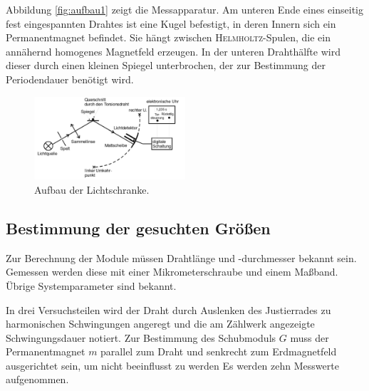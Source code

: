 Abbildung \ref{fig:aufbau1} zeigt die Messapparatur. 
Am unteren Ende eines einseitig fest eingespannten Drahtes ist eine Kugel befestigt, in deren Innern sich ein Permanentmagnet befindet. 
Sie hängt zwischen \textsc{Helmholtz}-Spulen, die ein annähernd homogenes Magnetfeld erzeugen.
In der unteren Drahthälfte wird dieser durch einen kleinen Spiegel unterbrochen, der zur Bestimmung der Periodendauer benötigt wird.
\label{sec:durchfuehrung2}
\begin{figure}[hbp]
	\centering
	\includegraphics[width=0.5\textwidth]{Bilder/Aufbau2.pdf}
	\caption{Aufbau der Lichtschranke. \cite{V102}}
	\label{fig:aufbau2}
\end{figure}
\subsection{Bestimmung der gesuchten Größen}
Zur Berechnung der Module müssen Drahtlänge und -durchmesser bekannt sein. 
Gemessen werden diese mit einer Mikrometerschraube und einem Maßband.
Übrige Systemparameter sind bekannt.

In drei Versuchsteilen wird der Draht durch Auslenken des Justierrades zu harmonischen Schwingungen angeregt und die am Zählwerk angezeigte Schwingungsdauer notiert.
Zur Bestimmung des Schubmoduls $G$ muss der Permanentmagnet $m$ parallel zum Draht und senkrecht zum Erdmagnetfeld ausgerichtet sein, um nicht beeinflusst zu werden
Es werden zehn Messwerte aufgenommen.

